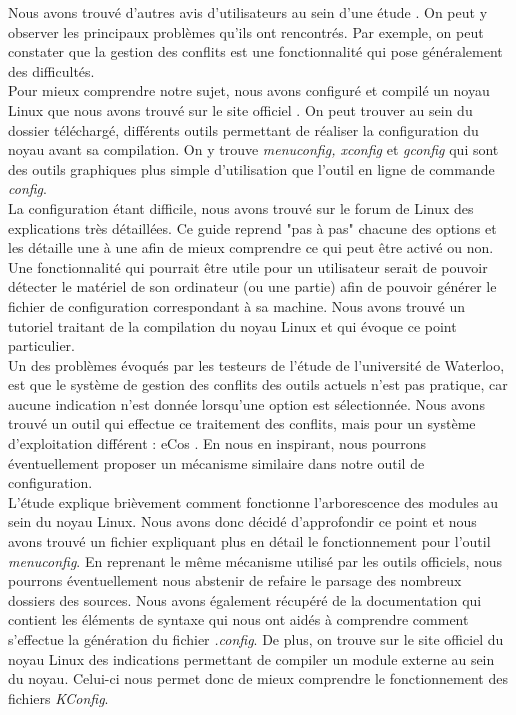 \documentclass[17pts]{report}
\begin{document}
Nous avons trouvé d'autres avis d'utilisateurs au sein d'une étude
\cite{Hubaux:2012:USC:2110147.2110164}. On peut y observer les principaux
problèmes qu'ils ont rencontrés. Par exemple, on peut constater que la gestion
des conflits est une fonctionnalité qui pose généralement des difficultés.  \\

Pour mieux comprendre notre sujet, nous avons configuré et compilé un noyau
Linux que nous avons trouvé sur le site officiel \cite{Kernel}. On peut trouver
au sein du dossier téléchargé, différents outils permettant de réaliser la
configuration du noyau avant sa compilation. On y trouve \textit{menuconfig,
xconfig} et \textit{gconfig} qui sont des outils graphiques plus simple
d'utilisation que l'outil en ligne de commande \textit{config}.  \\

La configuration étant difficile, nous avons trouvé sur le forum de Linux
\cite{Existant:Kernel:ForumTutoConfig} des explications très détaillées. Ce
guide reprend "pas à pas" chacune des options et les détaille une à une afin de
mieux comprendre ce qui peut être activé ou non.  \\

Une fonctionnalité qui pourrait être utile pour un utilisateur serait de
pouvoir détecter le matériel de son ordinateur (ou une partie) afin de pouvoir
générer le fichier de configuration correspondant à sa machine. Nous avons
trouvé un tutoriel \cite{Existant:Kernel:outils} traitant de la compilation du
noyau Linux et qui évoque ce point particulier.  \\

Un des problèmes évoqués par les testeurs de l'étude \cite{Waterloo:Etude} de
l'université de Waterloo, est que le système de gestion des conflits des outils
actuels n'est pas pratique, car aucune indication n'est donnée lorsqu'une
option est sélectionnée. Nous avons trouvé un outil qui effectue ce traitement
des conflits, mais pour un système d'exploitation différent : eCos
\cite{Existant:EcosConfig}. En nous en inspirant, nous pourrons éventuellement
proposer un mécanisme similaire dans notre outil de configuration.  \\

L'étude \cite{Waterloo:Etude} explique brièvement comment fonctionne
l'arborescence des modules au sein du noyau Linux. Nous avons donc décidé
d'approfondir ce point et nous avons trouvé un fichier
\cite{Existant:Kconfig:frontends} expliquant plus en détail le fonctionnement
pour l'outil \textit{menuconfig}. En reprenant le même mécanisme utilisé par
les outils officiels, nous pourrons éventuellement nous abstenir de refaire le
parsage des nombreux dossiers des sources. Nous avons également récupéré de la
documentation \cite{Existant:Kconfig:vueDensemble}
\cite{Existant:Kconfig:langage} qui contient les éléments de syntaxe qui nous
ont aidés à comprendre comment s'effectue la génération du fichier
\textit{.config}.  De plus, on trouve sur le site officiel du noyau Linux des
indications \cite{Existant:Kconfig:modules} permettant de compiler un module
externe au sein du noyau. Celui-ci nous permet donc de mieux comprendre le
fonctionnement des fichiers \textit{KConfig}.
\end{document}
